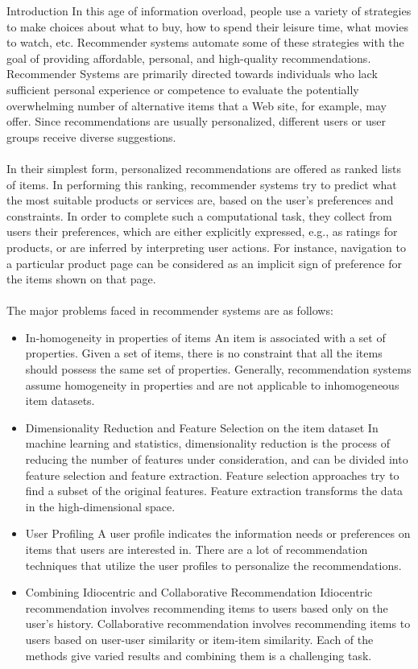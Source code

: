 \documentclass{report}
\begin{document}
\begin{projChapter}{Introduction}
        In this age of information overload, people use a variety of strategies to make choices about what to buy, how to spend their leisure time, what movies to watch, etc. Recommender systems automate some of these strategies with the goal of providing affordable, personal, and high-quality recommendations. Recommender Systems are primarily directed towards individuals who lack sufficient personal experience or competence to evaluate the potentially overwhelming number of alternative items that a Web site, for example, may offer. Since recommendations are usually personalized, different users or user groups receive diverse suggestions.
        ~\\\\
        In their simplest form, personalized recommendations are offered as ranked lists of items. In performing this ranking, recommender systems try to predict what the most suitable products or services are, based on the user's preferences and constraints. In order to complete such a computational task, they collect from users their preferences, which are either explicitly expressed, e.g., as ratings for products, or are inferred by interpreting user actions. For instance, navigation to a particular product page can be considered as an implicit sign of preference for the items shown on that page.
        ~\\\\
        The major problems faced in recommender systems are as follows:
        
\begin{itemize}
  \item In-homogeneity in properties of items
            An item is associated with a set of properties. Given a set of items, there is no constraint that all the items should possess the same set of properties. Generally, recommendation systems assume homogeneity in properties and are not applicable to inhomogeneous item datasets.
  \item Dimensionality Reduction and Feature Selection on the item dataset
            In machine learning and statistics, dimensionality reduction is the process of reducing the number of features under consideration, and can be divided into feature selection and feature extraction. Feature selection approaches try to find a subset of the original features. Feature extraction transforms the data in the high-dimensional space.
  \item User Profiling
            A user profile indicates the information needs or preferences on items that users are interested in. There are a lot of recommendation techniques that utilize the user profiles to personalize the recommendations.
  \item Combining Idiocentric and Collaborative Recommendation
            Idiocentric recommendation involves recommending items to users based only on the user's history. Collaborative recommendation involves recommending items to users based on user-user similarity or item-item similarity. Each of the methods give varied results and combining them is a challenging task.
\end{itemize}


\end{projChapter}
\end{document}
